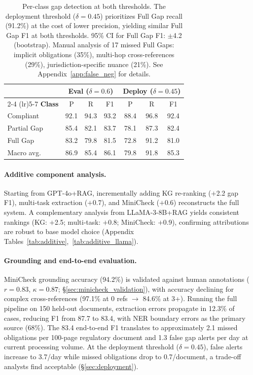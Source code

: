 \documentclass[11pt]{article}
\begin{document}
\begin{table}[t]
\centering
\small
\setlength{\tabcolsep}{2.5pt}
\begin{tabular}{@{}lcccccc@{}}
\toprule
& \multicolumn{3}{c}{\textbf{Eval ($\delta{=}0.6$)}} & \multicolumn{3}{c}{\textbf{Deploy ($\delta{=}0.45$)}} \\
\cmidrule(lr){2-4} \cmidrule(lr){5-7}
\textbf{Class} & P & R & F1 & P & R & F1 \\
\midrule
Compliant & 92.1 & 94.3 & 93.2 & 88.4 & 96.8 & 92.4 \\
Partial Gap & 85.4 & 82.1 & 83.7 & 78.1 & 87.3 & 82.4 \\
Full Gap & 83.2 & 79.8 & 81.5 & 72.8 & 91.2 & 81.0 \\
\midrule
Macro avg. & 86.9 & 85.4 & 86.1 & 79.8 & 91.8 & 85.3 \\
\bottomrule
\end{tabular}
\caption{Per-class gap detection at both thresholds. The deployment threshold ($\delta{=}0.45$) prioritizes Full Gap recall (91.2\%) at the cost of lower precision, yielding similar Full Gap F1 at both thresholds. 95\% CI for Full Gap F1: $\pm$4.2 (bootstrap). Manual analysis of 17 missed Full Gaps: implicit obligations (35\%), multi-hop cross-references (29\%), jurisdiction-specific nuance (21\%). See Appendix~\ref{app:false_neg} for details.}
\label{tab:deploy_threshold}
\end{table}

\paragraph{Additive component analysis.}  Starting from GPT-4o+RAG, incrementally adding KG re-ranking ($+$2.2 gap F1), multi-task extraction ($+$0.7), and MiniCheck ($+$0.6) reconstructs the full system. A complementary analysis from LLaMA-3-8B+RAG yields consistent rankings (KG: $+$2.5; multi-task: $+$0.8; MiniCheck: $+$0.9), confirming attributions are robust to base model choice (Appendix Tables~\ref{tab:additive},~\ref{tab:additive_llama}).

\paragraph{Grounding and end-to-end evaluation.}  MiniCheck grounding accuracy (94.2\%) is validated against human annotations ($r{=}0.83$, $\kappa{=}0.87$; \S\ref{sec:minicheck_validation}), with accuracy declining for complex cross-references (97.1\% at 0 refs $\to$ 84.6\% at 3+). Running the full pipeline on 150 held-out documents, extraction errors propagate in 12.3\% of cases, reducing F1 from 87.7 to 83.4, with NER boundary errors as the primary source (68\%). The 83.4 end-to-end F1 translates to approximately 2.1 missed obligations per 100-page regulatory document and 1.3 false gap alerts per day at current processing volume. At the deployment threshold ($\delta{=}0.45$), false alerts increase to 3.7/day while missed obligations drop to 0.7/document, a trade-off analysts find acceptable (\S\ref{sec:deployment}).
\end{document}
